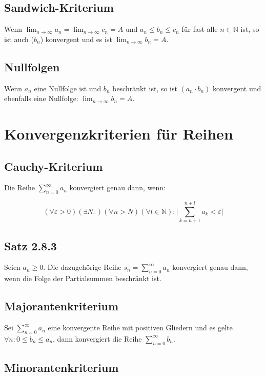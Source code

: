 \documentclass[10pt,twocolumn]{article}
\newcommand{\ra}{\rightarrow}
\renewcommand{\epsilon}{\varepsilon}
\begin{document}
\subsection{Sandwich-Kriterium}

Wenn $\lim_{n\ra\infty} a_n = \lim_{n\ra\infty} c_n = A$ und
$ a_n \leq b_n \leq c_n$ für fast alle $n \in \mathbb{N}$ ist, so ist
auch ($b_n$) konvergent und es ist $\lim_{n\ra\infty} b_n = A$.

\subsection{Nullfolgen}

Wenn $a_n$ eine Nullfolge ist und $b_n$ beschränkt ist, so ist
$(a_n \cdot b_n)$ konvergent und ebenfalls eine Nullfolge:
$\lim_{n\ra\infty} b_n = A$.

\section{Konvergenzkriterien für Reihen}

\subsection{Cauchy-Kriterium}

Die Reihe $\sum_{n=0}^\infty a_n$ konvergiert genau dann, wenn:

\[
    (\forall \epsilon > 0)(\exists N : )(\forall n > N)
        (\forall l \in \mathbb{N}) :
            \Bigg| \sum_{k=n+1}^{n+l} a_k < \epsilon \Bigg|
\]

\subsection{Satz 2.8.3}

Seien $a_n \geq 0$. Die dazugehörige Reihe $s_n = \sum_{n=0}^\infty a_n$
konvergiert genau dann, wenn die Folge der Partialsummen beschränkt ist.

\subsection{Majorantenkriterium}

Sei $\sum_{n=0}^\infty a_n$ eine konvergente Reihe mit positiven Gliedern
und es gelte $\forall n : 0 \leq b_n \leq a_n$, dann konvergiert die
Reihe $\sum_{n=0}^\infty b_n$.

\subsection{Minorantenkriterium}
\end{document}
